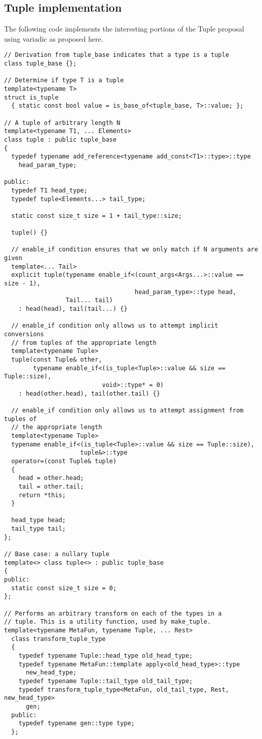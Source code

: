 \documentclass{article}
\begin{document}
\subsection{Tuple implementation}
\label{tupleimpl}
The following code implements the interesting portions of the Tuple
proposal~\cite{Jarvi02} using variadic as proposed here. 

\small
\begin{verbatim}
// Derivation from tuple_base indicates that a type is a tuple
class tuple_base {};

// Determine if type T is a tuple
template<typename T>
struct is_tuple
  { static const bool value = is_base_of<tuple_base, T>::value; };

// A tuple of arbitrary length N
template<typename T1, ... Elements>
class tuple : public tuple_base 
{
  typedef typename add_reference<typename add_const<T1>::type>::type
    head_param_type;

public:
  typedef T1 head_type;
  typedef tuple<Elements...> tail_type;

  static const size_t size = 1 + tail_type::size;

  tuple() {}

  // enable_if condition ensures that we only match if N arguments are given
  template<... Tail> 
  explicit tuple(typename enable_if<(count_args<Args...>::value == size - 1),
                                    head_param_type>::type head,
                 Tail... tail)
    : head(head), tail(tail...) {}

  // enable_if condition only allows us to attempt implicit conversions
  // from tuples of the appropriate length
  template<typename Tuple>
  tuple(const Tuple& other,
        typename enable_if<(is_tuple<Tuple>::value && size == Tuple::size), 
                           void>::type* = 0)
    : head(other.head), tail(other.tail) {}

  // enable_if condition only allows us to attempt assignment from tuples of
  // the appropriate length
  template<typename Tuple>
  typename enable_if<(is_tuple<Tuple>::value && size == Tuple::size),
                     tuple&>::type
  operator=(const Tuple& tuple)
  {
    head = other.head;
    tail = other.tail;
    return *this;
  }

  head_type head;
  tail_type tail;
};

// Base case: a nullary tuple
template<> class tuple<> : public tuple_base 
{
public:
  static const size_t size = 0;
};

// Performs an arbitrary transform on each of the types in a
// tuple. This is a utility function, used by make_tuple.
template<typename MetaFun, typename Tuple, ... Rest>
  class transform_tuple_type
  {
    typedef typename Tuple::head_type old_head_type;
    typedef typename MetaFun::template apply<old_head_type>::type
      new_head_type;
    typedef typename Tuple::tail_type old_tail_type;
    typedef transform_tuple_type<MetaFun, old_tail_type, Rest, new_head_type>
      gen;
  public:
    typedef typename gen::type type;
  };


\end{verbatim}
\end{document}
